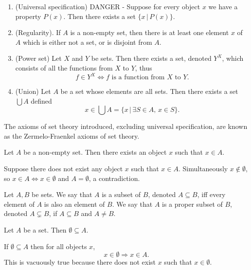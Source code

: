 \documentclass{article}
\begin{document}
\begin{definition}
\begin{enumerate}
		\item (Universal specification) DANGER - Suppose for every object \(x\) we have a property \(P(x)\). Then there exists a set \(\{x\,|\,P(x)\}\).
		\item (Regularity). If \(A\) is a non-empty set, then there is at least one element \(x\) of \(A\) which is either not a set, or is disjoint from \(A\).
		\item (Power set) Let \(X\) and \(Y\) be sets. Then there exists a set, denoted \(Y^X\), which consists of all the functions from \(X\) to \(Y\), thus
			\begin{equation*}
				f\in Y^X\Leftrightarrow f\text{ is a function from } X\text{ to }Y.
			\end{equation*}
		\item (Union) Let \(A\) be a set whose elements are all sets. Then there exists a set \(\bigcup A\) defined
			\begin{equation*}
				x\in\bigcup A=\{x\,|\,\exists S\in A,\,x\in S\}.
			\end{equation*}
	\end{enumerate}
\end{definition}
\begin{remark}
	The axioms of set theory introduced, excluding universal specification, are known as the Zermelo-Fraenkel axioms of set theory.
\end{remark}
\begin{lemma}
\label{singlechoice}
	Let \(A\) be a non-empty set. Then there exists an object \(x\) such that \(x\in A\).
\end{lemma}
\begin{IEEEproof}
	Suppose there does not exist any object \(x\) such that \(x\in A\). Simultaneously \(x\notin\emptyset\), so \(x\in A\Leftrightarrow x\in\emptyset\) and \(A=\emptyset\), a contradiction.
\end{IEEEproof}
\begin{definition}[Subset]
	Let \(A,B\) be sets. We say that \(A\) is a subset of \(B\), denoted \(A\subseteq B\), iff every element of \(A\) is also an element of \(B\). We say that \(A\) is a proper subset of \(B\), denoted \(A\subsetneq B\), if \(A\subseteq B\) and \(A\neq B\).
\end{definition}
\begin{theorem}
	Let \(A\) be a set. Then \(\emptyset\subseteq A\).
\end{theorem}
\begin{IEEEproof}
	If \(\emptyset\subseteq A\) then for all objects \(x\),
	\begin{equation*}
		x\in\emptyset\Rightarrow x\in A.
	\end{equation*}
	This is vacuously true because there does not exist \(x\) such that \(x\in\emptyset\).
\end{IEEEproof}
\end{document}
